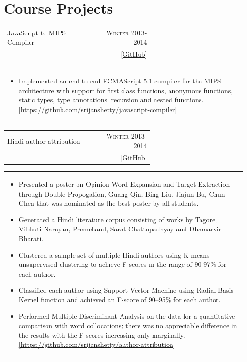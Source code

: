 \documentclass[a4paper]{article} %
\newcommand{\cproject}[5]{
    \begin{tabular}{p{0.60\linewidth}r}
        \textcolor{NavyBlue}{\small #2} & \multicolumn{1}{m{7.3cm}}{\raggedleft \small {\textsc{#1}}}\\
        \small {#3} & \small {#4}
    \end{tabular}
    \begin{tabular}{p{0.98\linewidth}}
    \vspace{-0.3cm}
        \footnotesize {#5}
    \end{tabular}
    \vspace{-0.45cm}
}
\begin{document}
\section{Course Projects}

\cproject
    {Winter 2013-2014}
    {JavaScript to MIPS Compiler}
    {\textsc{\raggedright Compilers}, Professor Subhajit Roy}
    { \href{https://github.com/srijanshetty/javascript-compiler} {[GitHub]} }
    {
        \begin{itemize}[leftmargin=0.5cm]
          \item Implemented an end-to-end ECMAScript 5.1 compiler for the MIPS architecture with support for first class
          functions, anonymous functions, static types, type annotations, recursion and nested functions.
          \href{https://github.com/srijanshetty/javascript-compiler} {[https://github.com/srijanshetty/javascript-compiler]}
        \end{itemize}
    }

\cproject
    {Winter 2013-2014}
    {Hindi author attribution}
    {\textsc{\raggedright Artificial Intelligence}, Professor Amitabha Mukherjee}
    { \href{https://github.com/srijanshetty/author-attribution} {[GitHub]} }
    {
     \begin{itemize}[leftmargin=0.5cm]
         \item Presented a poster on Opinion Word Expansion and Target Extraction through Double Propogation, Guang Qin,
             Bing Liu, Jiajun Bu, Chun Chen that was nominated as the best poster by all students.
         \item Generated a Hindi literature corpus consisting of works by Tagore,
             Vibhuti Narayan, Premchand, Sarat Chattopadhyay and Dhamarvir Bharati.
         \item Clustered a sample set of multiple Hindi authors using K-means unsupervised clustering to achieve
             F-scores in the range of 90-97\% for each author.
         \item Classified each author using Support Vector Machine using Radial Basis Kernel function
             and achieved an F-score of 90--95\% for each author.
         \item Performed Multiple Discriminant Analysis on the data for a quantitative comparison with word
             collocations; there was no appreciable difference in the results with the F-scores increasing only
             marginally.
          \href{https://github.com/srijanshetty/author-attribution} {[https://github.com/srijanshetty/author-attribution]}
     \end{itemize}
    }
\end{document}
